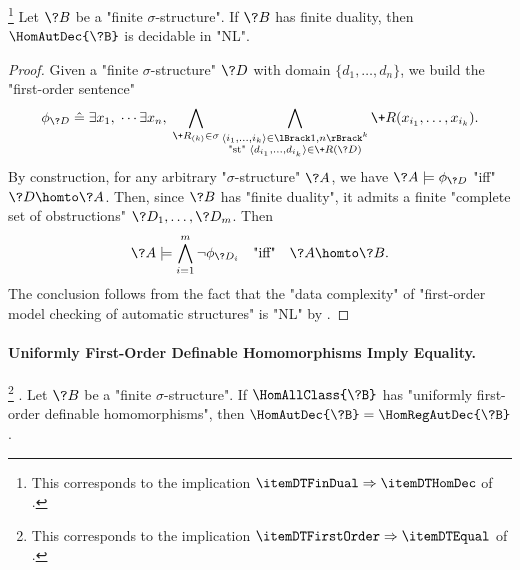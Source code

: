 \begin{proposition}
	\!\footnote{This corresponds to the implication $\itemDTFinDual \Rightarrow \itemDTHomDec$
	of .}
	\AP\label{prop:dichotomy-FinDual-implies-HomDec}
	Let $\?B$ be a "finite $\sigma$-structure".
	If $\?B$ has finite duality, then $\HomAutDec{\?B}$ is decidable in "NL".
\end{proposition}

\begin{proof}
	Given a "finite $\sigma$-structure" $\?D$ with domain $\{d_1,\hdots,d_n\}$,
	we build the "first-order sentence"
	\[
		\phi_{\?D} \defeq \exists x_1,\; \cdots \exists x_n,\;
		\bigwedge_{\+R_{(k)} \in \sigma} \bigwedge_{\substack{\tup{i_1,\hdots,i_k} \in \lBrack 1,n\rBrack^k\\\text{"st" }\tup{d_{i_1},\hdots,d_{i_k}} \in \+R(\?D)}}
		\+R(x_{i_1},\hdots,x_{i_k}).
	\]
	By construction, for any arbitrary "$\sigma$-structure" $\?A$, we have $\?A \models \phi_{\?D}$
	"iff" $\?D \homto \?A$.
	Then, since $\?B$ has "finite duality", it admits a finite "complete set of obstructions" $\?D_1,\hdots,\?D_m$.
	Then
	\[
		\?A \models \bigwedge_{i=1}^m \neg \phi_{\?D_i}
		\quad\text{"iff"}\quad 
		\?A \homto \?B.
	\]
	The conclusion follows from the fact that the "data complexity"
	of "first-order model checking of automatic structures" is "NL"
	by .
\end{proof}

\paragraph*{Uniformly First-Order Definable Homomorphisms Imply Equality.}

\begin{proposition}
	\!\footnote{This corresponds to the implication $\itemDTFirstOrder \Rightarrow \itemDTEqual$
	of .}
	\AP\label{prop:dichotomy-FirstOrder-implies-Equal}.
	Let $\?B$ be a "finite $\sigma$-structure".
	If $\HomAllClass{\?B}$ has "uniformly first-order definable homomorphisms", then
	$\HomAutDec{\?B} = \HomRegAutDec{\?B}$.
\end{proposition}

